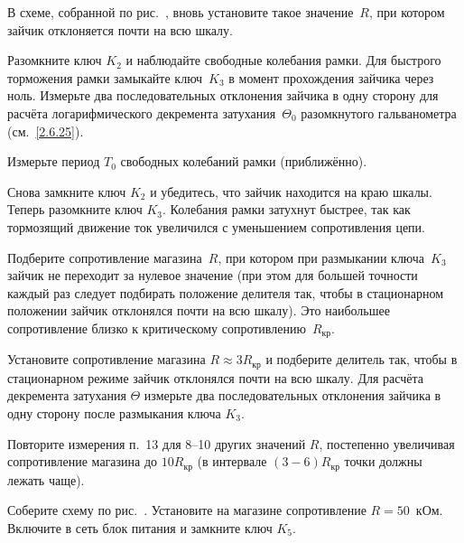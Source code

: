 \begin{lab:task}

	\item В схеме, собранной по рис.~, 
    вновь установите такое значение~$R$, при котором зайчик 
    отклоняется почти на всю шкалу.

	\item \label{p8-326} Разомкните ключ $K_2$ и наблюдайте свободные
колебания рамки. Для быстрого торможения рамки замыкайте ключ~$K_3$ 
в момент прохождения зайчика через ноль.
Измерьте два последовательных отклонения зайчика в одну сторону для
расчёта логарифмического декремента затухания~$\Theta_0$ 
разомкнутого гальванометра (см.~\eqref{2.6.25}).

	\item \label{p9-326} Измерьте период $T_0$ свободных колебаний рамки
(приближённо).

	\item Снова замкните ключ $K_2$ и убедитесь, что
зайчик находится на краю шкалы. Теперь разомкните ключ
$K_3$. Колебания рамки затухнут быстрее, так как
тормозящий движение ток увеличился с уменьшением сопротивления цепи.

	\item \label{p12-326} Подберите  сопротивление магазина~$R$, при
котором при размыкании ключа~$K_3$ зайчик не
переходит за нулевое значение (при этом для большей точности каждый раз
следует подбирать положение делителя так, чтобы в стационарном положении
зайчик отклонялся почти на всю шкалу). Это наибольшее сопротивление
близко к критическому сопротивлению~$R_{\text{кр}}$.

	\item Установите сопротивление магазина $R \approx 3R_{\text{кр}}$ и подберите
делитель так, чтобы в стационарном режиме зайчик отклонялся почти на всю
шкалу. Для расчёта декремента затухания $\Theta$ измерьте два последовательных
отклонения зайчика в одну сторону после размыкания ключа $K_3$.

	\item \label{p14-326} Повторите измерения п.~13 для 8--10 других значений $R$,
постепенно увеличивая сопротивление магазина до $10R_{\text{кр}}$ (в интервале $(3-6)R_{\text{кр}}$
точки должны лежать чаще).


	\item Соберите схему по рис.~. Установите на магазине сопротивление
$R=50$~кОм. Включите в сеть блок питания и замкните ключ
$K_5$.


\end{lab:task}
